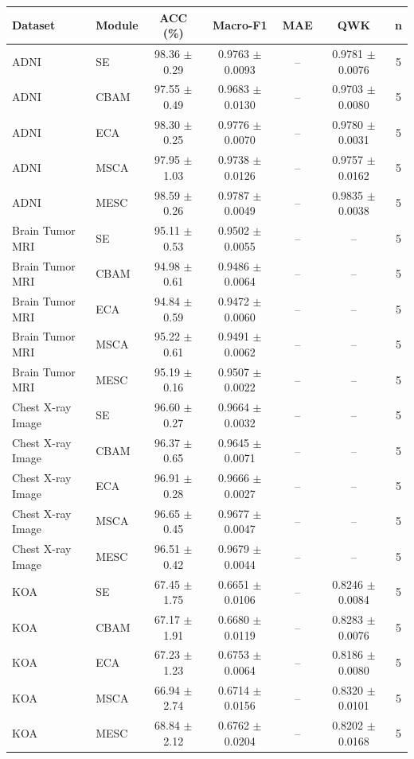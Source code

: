 \begin{tabular}{llccccc}
\toprule
Dataset & Module & ACC (\%) & Macro-F1 & MAE & QWK & n \\
\midrule
ADNI & SE & 98.36 $\pm$ 0.29 & 0.9763 $\pm$ 0.0093 & -- & 0.9781 $\pm$ 0.0076 & 5 \\
ADNI & CBAM & 97.55 $\pm$ 0.49 & 0.9683 $\pm$ 0.0130 & -- & 0.9703 $\pm$ 0.0080 & 5 \\
ADNI & ECA & 98.30 $\pm$ 0.25 & 0.9776 $\pm$ 0.0070 & -- & 0.9780 $\pm$ 0.0031 & 5 \\
ADNI & MSCA & 97.95 $\pm$ 1.03 & 0.9738 $\pm$ 0.0126 & -- & 0.9757 $\pm$ 0.0162 & 5 \\
ADNI & MESC & 98.59 $\pm$ 0.26 & 0.9787 $\pm$ 0.0049 & -- & 0.9835 $\pm$ 0.0038 & 5 \\
Brain Tumor MRI & SE & 95.11 $\pm$ 0.53 & 0.9502 $\pm$ 0.0055 & -- & -- & 5 \\
Brain Tumor MRI & CBAM & 94.98 $\pm$ 0.61 & 0.9486 $\pm$ 0.0064 & -- & -- & 5 \\
Brain Tumor MRI & ECA & 94.84 $\pm$ 0.59 & 0.9472 $\pm$ 0.0060 & -- & -- & 5 \\
Brain Tumor MRI & MSCA & 95.22 $\pm$ 0.61 & 0.9491 $\pm$ 0.0062 & -- & -- & 5 \\
Brain Tumor MRI & MESC & 95.19 $\pm$ 0.16 & 0.9507 $\pm$ 0.0022 & -- & -- & 5 \\
Chest X-ray Image & SE & 96.60 $\pm$ 0.27 & 0.9664 $\pm$ 0.0032 & -- & -- & 5 \\
Chest X-ray Image & CBAM & 96.37 $\pm$ 0.65 & 0.9645 $\pm$ 0.0071 & -- & -- & 5 \\
Chest X-ray Image & ECA & 96.91 $\pm$ 0.28 & 0.9666 $\pm$ 0.0027 & -- & -- & 5 \\
Chest X-ray Image & MSCA & 96.65 $\pm$ 0.45 & 0.9677 $\pm$ 0.0047 & -- & -- & 5 \\
Chest X-ray Image & MESC & 96.51 $\pm$ 0.42 & 0.9679 $\pm$ 0.0044 & -- & -- & 5 \\
KOA & SE & 67.45 $\pm$ 1.75 & 0.6651 $\pm$ 0.0106 & -- & 0.8246 $\pm$ 0.0084 & 5 \\
KOA & CBAM & 67.17 $\pm$ 1.91 & 0.6680 $\pm$ 0.0119 & -- & 0.8283 $\pm$ 0.0076 & 5 \\
KOA & ECA & 67.23 $\pm$ 1.23 & 0.6753 $\pm$ 0.0064 & -- & 0.8186 $\pm$ 0.0080 & 5 \\
KOA & MSCA & 66.94 $\pm$ 2.74 & 0.6714 $\pm$ 0.0156 & -- & 0.8320 $\pm$ 0.0101 & 5 \\
KOA & MESC & 68.84 $\pm$ 2.12 & 0.6762 $\pm$ 0.0204 & -- & 0.8202 $\pm$ 0.0168 & 5 \\
\bottomrule
\end{tabular}
